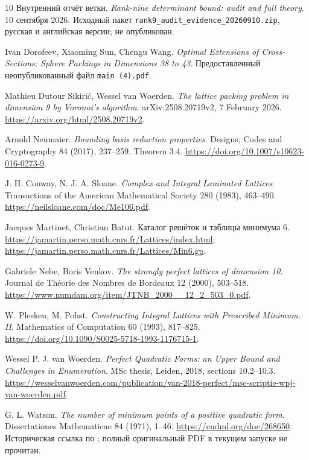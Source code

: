 \documentclass[11pt,a4paper]{article}
\theoremstyle{remark}\newtheorem{remark}[theorem]{Замечание}
\newcommand{\file}[1]{{\small\nolinkurl{#1}}}
\begin{document}
\clearpage
\begin{thebibliography}{10}
Внутренний отчёт ветки. \emph{Rank-nine determinant bound: audit and full theory}. 10 сентября 2026. Исходный пакет \file{rank9_audit_evidence_20260910.zip}, русская и английская версии; не опубликован.

Ivan Dorofeev, Xiaoming Sun, Chengu Wang.
\emph{Optimal Extensions of Cross-Sections: Sphere Packings in Dimensions 38 to 43}.
Предоставленный неопубликованный файл \file{main (4).pdf}.

Mathieu Dutour Sikirić, Wessel van Woerden.
\emph{The lattice packing problem in dimension 9 by Voronoi's algorithm}.
arXiv:2508.20719v2, 7 February 2026.
\url{https://arxiv.org/html/2508.20719v2}.

Arnold Neumaier.
\emph{Bounding basis reduction properties}.
Designs, Codes and Cryptography 84 (2017), 237--259.
Theorem 3.4.
\url{https://doi.org/10.1007/s10623-016-0273-9}.

J. H. Conway, N. J. A. Sloane.
\emph{Complex and Integral Laminated Lattices}.
Transactions of the American Mathematical Society 280 (1983), 463--490.
\url{https://neilsloane.com/doc/Me106.pdf}.

Jacques Martinet, Christian Batut. Каталог решёток и таблицы минимума 6.
\url{https://jamartin.perso.math.cnrs.fr/Lattices/index.html};
\url{https://jamartin.perso.math.cnrs.fr/Lattices/Min6.gp}.

Gabriele Nebe, Boris Venkov.
\emph{The strongly perfect lattices of dimension 10}.
Journal de Théorie des Nombres de Bordeaux 12 (2000), 503--518.
\url{https://www.numdam.org/item/JTNB_2000__12_2_503_0.pdf}.

W. Plesken, M. Pohst.
\emph{Constructing Integral Lattices with Prescribed Minimum. II}.
Mathematics of Computation 60 (1993), 817--825.
\url{https://doi.org/10.1090/S0025-5718-1993-1176715-1}.

Wessel P. J. van Woerden.
\emph{Perfect Quadratic Forms: an Upper Bound and Challenges in Enumeration}.
MSc thesis, Leiden, 2018, sections 10.2--10.3.
\url{https://wesselvanwoerden.com/publication/van-2018-perfect/msc-scriptie-wpj-van-woerden.pdf}.

G. L. Watson. \emph{The number of minimum points of a positive quadratic form}.
Dissertationes Mathematicae 84 (1971), 1--46.
\url{https://eudml.org/doc/268650}.
Историческая ссылка по \cite{dw}; полный оригинальный PDF в текущем запуске не прочитан.
\end{thebibliography}
\end{document}
